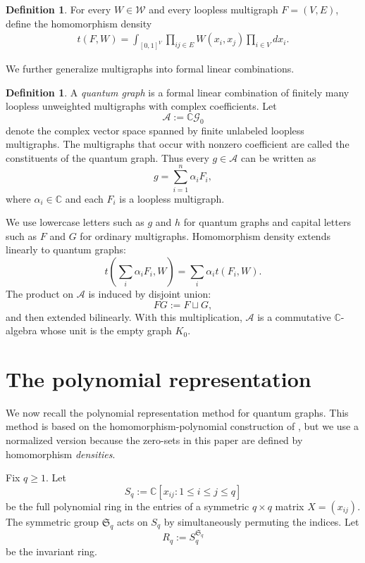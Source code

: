 \documentclass[a4paper,12pt]{article}
\let\cite\parencite
\theoremstyle{definition}
\newtheorem{definition}[lemma]{Definition}
\newcommand\cW{\mathcal{W}}
\newcommand\cG{\mathcal{G}}
\newcommand\cA{\mathcal{A}}
\newcommand\C{\mathbb{C}}
\newcommand\Sym{\mathfrak{S}}
\newcommand\Rq{R_q}
\newcommand\Sq{S_q}
\begin{document}
\begin{definition}\label{definition:hom density}
For every $W\in\cW$ and every loopless multigraph $F=(V,E)$, define the homomorphism density
\begin{align*}
   t(F,W)=\int_{[0,1]^V}\prod_{ij\in E}W(x_i,x_j)\prod_{i\in V}dx_i.
\end{align*}
\end{definition}

We further generalize multigraphs into formal linear combinations.

\begin{definition}\label{definition:quantum graph}
A \textit{quantum graph} is a formal linear combination of finitely many loopless unweighted multigraphs with complex coefficients. Let
\[
\cA:=\C\cG_0
\]
denote the complex vector space spanned by finite unlabeled loopless multigraphs. The multigraphs that occur with nonzero coefficient are called the constituents of the quantum graph. Thus every $g\in\cA$ can be written as
\[
    g=\sum_{i=1}^n\alpha_iF_i,
\]
where $\alpha_i\in\C$ and each $F_i$ is a loopless multigraph.
\end{definition}

We use lowercase letters such as $g$ and $h$ for quantum graphs and capital letters such as $F$ and $G$ for ordinary multigraphs. Homomorphism density extends linearly to quantum graphs:
\[
    t\!\left(\sum_i\alpha_iF_i,W\right)=\sum_i\alpha_i t(F_i,W).
\]
The product on $\cA$ is induced by disjoint union:
\[
    FG:=F\sqcup G,
\]
and then extended bilinearly. With this multiplication, $\cA$ is a commutative $\C$-algebra whose unit is the empty graph $K_0$.

\section{The polynomial representation}\label{section: Cat}

We now recall the polynomial representation method for quantum graphs. This method is based on the homomorphism-polynomial construction of \cite{SCHRIJVER2009502, hombook}, but we use a normalized version because the zero-sets in this paper are defined by homomorphism \emph{densities}.

Fix $q\geq1$. Let
\[
    \Sq:=\C[x_{ij}:1\leq i\leq j\leq q]
\]
be the full polynomial ring in the entries of a symmetric $q\times q$ matrix $X=(x_{ij})$. The symmetric group $\Sym_q$ acts on $\Sq$ by simultaneously permuting the indices. Let
\[
    \Rq:=\Sq^{\Sym_q}
\]
be the invariant ring.
\end{document}

